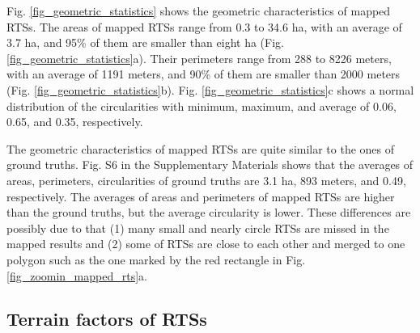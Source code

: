 \documentclass[preprint,12pt,authoryear]{elsarticle}
\begin{document}
Fig. \ref{fig_geometric_statistics} shows the geometric characteristics of mapped RTSs.  The areas of mapped RTSs range from 0.3 to 34.6 ha, with an average of 3.7 ha, and 95\% of them are smaller than eight ha (Fig. \ref{fig_geometric_statistics}a). Their perimeters range from 288 to 8226 meters, with an average of 1191 meters, and 90\% of them are smaller than 2000 meters (Fig. \ref{fig_geometric_statistics}b). Fig. \ref{fig_geometric_statistics}c shows a normal distribution of the circularities with minimum, maximum, and average of 0.06, 0.65, and 0.35, respectively. 

The geometric characteristics of mapped RTSs are quite similar to the ones of ground truths. Fig. S6 in the Supplementary Materials shows that the averages of areas, perimeters, circularities of ground truths 
 are 3.1 ha, 893 meters, and 0.49, respectively. The averages of areas and perimeters of mapped RTSs are higher than the ground truths, but the average circularity is lower. These differences are possibly due to that (1) many small and nearly circle RTSs are missed in the mapped results and (2) some of RTSs are close to each other and merged to one polygon such as the one marked by the red rectangle in Fig. \ref{fig_zoomin_mapped_rts}a.  

\subsection{Terrain factors of RTSs}
\label{subsec_terrain}
\end{document}

